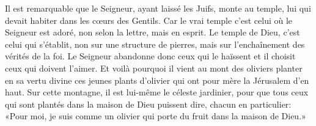 Il est remarquable que le Seigneur, ayant laissé les Juifs, monte au temple,
	lui qui devait habiter dans les cœurs des Gentils.
Car le vrai temple c’est celui où le Seigneur est adoré,
	non selon la lettre, mais en esprit.
Le temple de Dieu, c’est celui qui s’établit,
	non sur une structure de pierres,
		mais sur l’enchaînement des vérités de la foi.
Le Seigneur abandonne donc ceux qui le haïssent
	et il choisit ceux qui doivent l’aimer.
Et voilà pourquoi il vient au mont des oliviers
	planter en sa vertu divine
		ces jeunes plants d’olivier qui ont pour mère la Jérusalem d’en haut.
Sur cette montagne, il est lui-même le céleste jardinier,
	pour que tous ceux qui sont plantés dans la maison de Dieu puissent dire,
		chacun en particulier:
	«Pour moi, je suis comme un olivier
		qui porte du fruit dans la maison de Dieu.»
